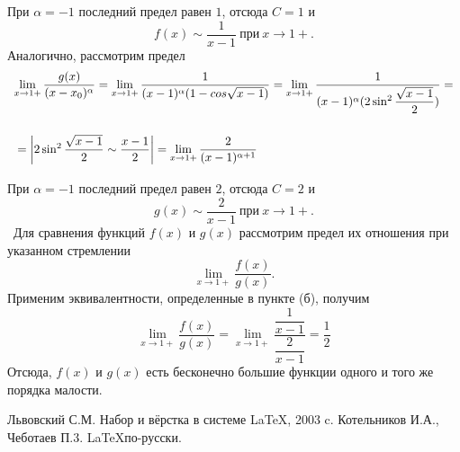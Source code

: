 \documentclass[12pt]{article}
\begin{document}
При $\alpha=-1 $ последний предел равен $1$, отсюда $C=1$ и 
$$
f(x)\sim \dfrac{1}{x-1} ~\text{при}~x\rightarrow 1+.
$$
Аналогично, рассмотрим предел
$$
\begin{array}{l}
\lim\limits_{x\rightarrow 1+}\dfrac{g(x)}{(x-x_0)^{\alpha}}=\lim\limits_{x\rightarrow 1+} \dfrac{1}{(x-1)^{\alpha}(1-cos\sqrt{x-1})} =\lim\limits_{x\rightarrow 1+} \dfrac{1}{(x-1)^{\alpha}(2\sin^2\dfrac{\sqrt{x-1}}{2})}=\\ \medskip{}{} \\ \medskip{}{}=\left|2\sin^2\dfrac{\sqrt{x-1}}{2} \sim \dfrac{x-1}{2} \right|=\lim\limits_{x\rightarrow 1+} \dfrac{2}{(x-1)^{\alpha+1}}
\end{array}
$$
При $\alpha=-1$ последний предел равен $2$, отсюда $C=2$ и
$$
g(x)\sim\dfrac{2}{x-1}~\text{при}~x\rightarrow 1+.
$$
~Для сравнения функций $f(x)$ и $g(x)$ рассмотрим предел их отношения при указанном стремлении
$$
\lim\limits_{x\rightarrow 1+}\dfrac{f(x)}{g(x)}.
$$
Применим эквивалентности, определенные в пункте (б), получим
$$
\lim\limits_{x\rightarrow 1+}\dfrac{f(x)}{g(x)} = \lim\limits_{x\rightarrow 1+}\dfrac{\dfrac{1}{x-1}}{\dfrac{2}{x-1}}=\dfrac{1}{2}
$$
Отсюда, $f(x)$ и $g(x)$ есть бесконечно большие функции одного и того же порядка малости.
%
\newpage
{}
\begin{thebibliography}{99}
 Львовский С.М. Набор и вёрстка в системе \LaTeX, 2003 c.
 Котельников И.А., Чеботаев П.3. \LaTeX по-русски.
\end{thebibliography}
\end{document}
